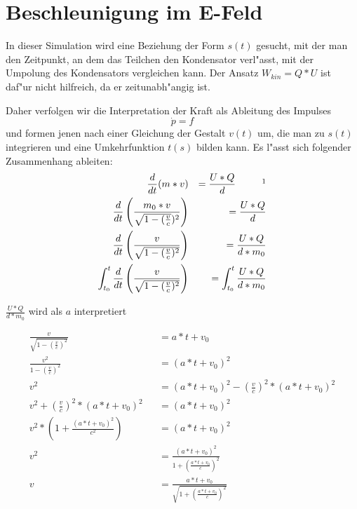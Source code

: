 \documentclass[14pt, a4paper]{report}
\begin{document}
\section{Beschleunigung im E-Feld}
In dieser Simulation wird eine Beziehung der Form $s(t)$ gesucht, mit der man den
Zeitpunkt, an dem das Teilchen den Kondensator verl"asst, mit der Umpolung des 
Kondensators vergleichen kann. Der Ansatz $W_{kin}  = Q * U $ ist daf"ur nicht
hilfreich, da er zeitunabh"angig ist.

Daher verfolgen wir die Interpretation der Kraft als Ableitung des Impulses
\begin{equation}
\dot{p} = f 
\end{equation}
und formen jenen nach einer Gleichung der Gestalt $v(t)$ um, die man zu $s(t)$
integrieren und eine Umkehrfunktion $t(s)$ bilden kann.
\newpage
Es l"asst sich folgender Zusammenhang ableiten:
\begin{eqnarray}
\frac{d}{dt} (m * v ) && = \frac{U * Q}{d} ~~~~~~~~\footnotemark \\
\frac{d}{dt} \left(\frac{m_0 * v}{\sqrt{1 - (\frac{v}{c}})^2}\right) && = \frac{U * Q}{d} \\
\frac{d}{dt} \left(\frac{v}{\sqrt{1 - (\frac{v}{c})^2}}\right) && = \frac{U * Q}{d * m_0} \\
\int_{t_0}^t \frac{d}{dt} \left(\frac{v}{\sqrt{1 - (\frac{v}{c})^2}}\right) 
    && = \int_{t_0}^t \frac{U * Q}{d * m_0} \\
\end{eqnarray}
\begin{center}
$ \frac{U * Q}{d * m_0} $ wird als $ a $ interpretiert \label{Beschleunigung}
\end{center}
\begin{eqnarray}
\frac{v}{\sqrt{1 - \left(\frac{v}{c}\right)^2}} && = a * t + v_0 \\
\frac{v^2}{1 - \left(\frac{v}{c}\right)^2} && = \left(a * t + v_0 \right)^2 \\
v^2  && = \left(a * t + v_0\right)^2 - \left(\frac{v}{c}\right)^2 * \left(a * t + v_0 \right)^2\\
v^2 + \left(\frac{v}{c}\right)^2 * \left(a * t + v_0\right)^2 && = \left(a * t + v_0 \right)^2 \\
v^2 * \left(1 + \frac{(a * t + v_0)^2}{c^2}\right) &&  = \left(a * t + v_0\right)^2 \\
v^2 && = \frac{\left(a * t + v_0\right)^2}{1 + \left(\frac{a * t + v_0}{c}\right)^2} \\ 
v && = \frac{a * t + v_0}{\sqrt{1 + \left(\frac{a * t + v_0}{c}\right)^2}}
\end{eqnarray}
\end{document}
